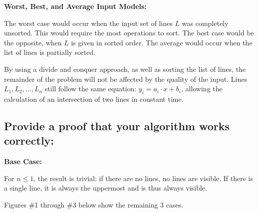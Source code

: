 \documentclass{article}
\begin{document}
\noindent \textbf{Worst, Best, and Average Input Models:}

The worst case would occur when the input set of lines $L$ was completely unsorted.  
This would require the most operations to sort.  The best case would be the opposite, when $L$ is given in sorted order.  
The average would occur when the list of lines is partially sorted.

By using a divide and conquer approach, as well as sorting the list of lines, the remainder of the problem will not be affected by the quality of the input.  
Lines $L_1, L_2, \dots , L_n$ still follow the same equation:  $y_i = a_i \cdot x + b_i$, allowing the calculation of an intersection of two lines in constant time.

\subsection{Provide a proof that your algorithm works correctly:}
\noindent \textbf{Base Case:}

For $n \leq 1$, the result is trivial:  if there are no lines, no lines are visible.  If there is a single line, it is always the uppermost and is thus always visible.

Figures \#1 through \#3 below show the remaining 3 cases.
\end{document}
